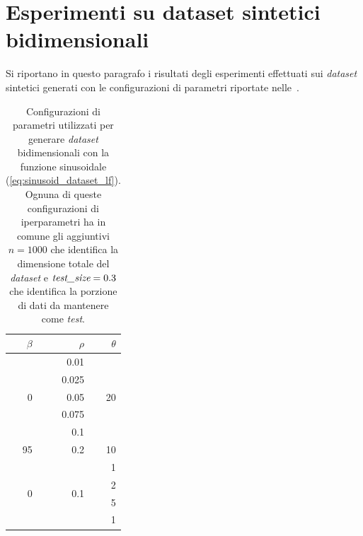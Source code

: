 \section{Esperimenti su dataset sintetici bidimensionali}\label{sec:exp:synth_2d}
Si riportano in questo paragrafo i risultati degli esperimenti effettuati sui \emph{dataset} sintetici generati con le configurazioni di parametri riportate nelle~.
\begin{table}
    \centering
    \begin{tabular}{rrr}
        \toprule
         $\beta$ & $\rho$ & $\theta$ \\
        \midrule
        \multirow{5}{*}{0}  & 0.01  & \multirow{5}{*}{20} \\        
                            & 0.025 &     \\        
                            & 0.05  &     \\        
                            & 0.075 &     \\        
                            & 0.1   &     \\
        
        95                  & 0.2   & 10    \\   

        \multirow{4}{*}{0}  & \multirow{4}{*}{0.1}  & 1     \\    
                            &                       & 2     \\    
                            &                       & 5     \\    
                            &                       & 1     \\    
        \bottomrule
    \end{tabular}
    \caption{Configurazioni di parametri utilizzati per generare \emph{dataset} bidimensionali con la funzione sinusoidale (\ref{eq:sinusoid_dataset_lf}). Ognuna di queste configurazioni di iperparametri ha in comune gli aggiuntivi $n=1000$ che identifica la dimensione totale del \emph{dataset} e $\emph{test\_size}=0.3$ che identifica la porzione di dati da mantenere come \emph{test}.}
    \label{tab:parametri_ds_sin}
\end{table}
